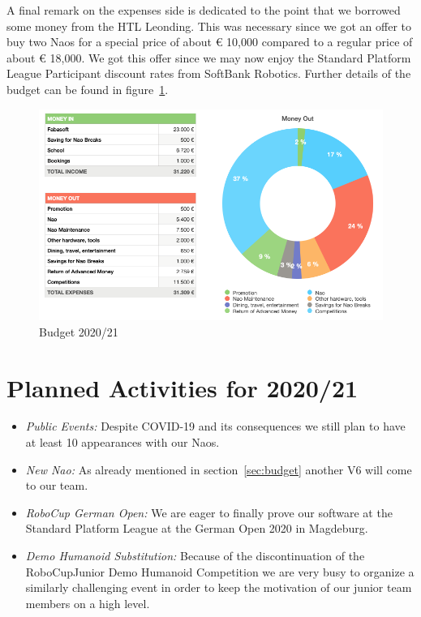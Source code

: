 \documentclass[11pt]{article}
\begin{document}
A final remark on the expenses side is dedicated to the point that we borrowed some money from the HTL Leonding. This was necessary since we got an offer to buy two Naos for a special price of about € 10,000 compared to a regular price of about € 18,000. We got this offer since we may now enjoy the Standard Platform League Participant discount rates from SoftBank Robotics. Further details of the budget can be found in figure~\ref{fig:budget}.
\begin{figure}
\begin{center}
\includegraphics[scale=0.5]{img/budget.png}
\end{center}
\caption{Budget 2020/21}
\label{fig:budget}
\end{figure}

\section{Planned Activities for 2020/21}

\begin{itemize}
	\item {\em Public Events:}  Despite COVID-19 and its consequences we still plan to have at least 10 appearances with our Naos.
	\item {\em New Nao:} As already mentioned in section~\ref{sec:budget} another V6 will come to our team.
	\item {\em RoboCup German Open:} We are eager to finally prove our software at the Standard Platform League at the German Open 2020 in Magdeburg.
	\item {\em Demo Humanoid Substitution:} Because of the discontinuation of the RoboCupJunior Demo Humanoid Competition we are very busy to organize a similarly challenging event in order to keep the motivation of our junior team members on a high level.
\end{itemize}
\end{document}
